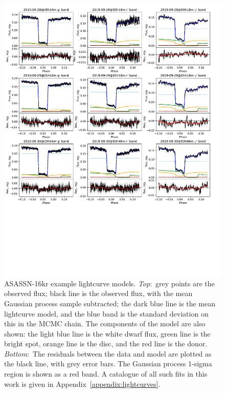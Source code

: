 \begin{figure}
    \centering
    \includegraphics[width=\textwidth, trim={0.5 28.5cm 0.5 0}, clip]{figures/results/three_cvs_with_weird_colours/ASASSN-16kr/ASASSN-16kr_lightcurves_6.pdf}
    \caption{ASASSN-16kr example lightcurve models. {\it Top}:~grey points are the observed flux; black line is the observed flux, with the mean Gaussian process sample subtracted; the dark blue line is the mean lightcurve model, and the blue band is the standard deviation on this in the MCMC chain. The components of the model are also shown: the light blue line is the white dwarf flux, green line is the bright spot, orange line is the disc, and the red line is the donor. {\it Bottom}:~The residuals between the data and model are plotted as the black line, with grey error bars. The Gaussian process 1-sigma region is shown as a red band. A catalogue of all such fits in this work is given in Appendix~\ref{appendix:lightcurves}.}
    \label{fig:ASASSN-16kr example lightcurves}
\end{figure}

